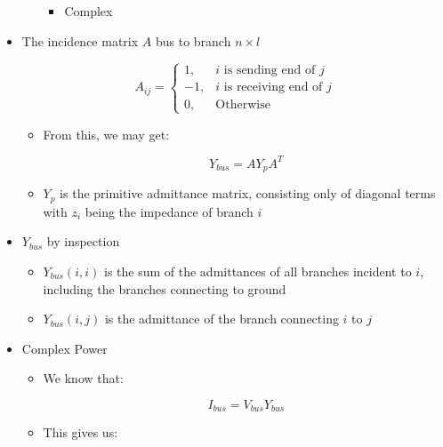 \begin{itemize}
\begin{itemize}
\begin{itemize}
          \item Complex

        \end{itemize}

    \end{itemize}

  \item The incidence matrix $A$ bus to branch $n\times l$

    $$A_{ij}=\left\{  \begin{array}{ll} 1,& i\text{ is sending end of }j\\ -1,&i\text{ is receiving end of }j\\ 0,&\text{Otherwise}\end{array}$$

      \begin{itemize}

        \item From this, we may get:

          $$Y_{bus}=A Y_p A^T$$

        \item $Y_p$ is the primitive admittance matrix, consisting only of diagonal terms with $z_i$ being the impedance of branch $i$

      \end{itemize}

    \item $Y_{bus}$ by inspection

      \begin{itemize}

        \item $Y_{bus}(i,i)$ is the sum of the admittances of all branches incident to $i$, including the branches connecting to ground

        \item $Y_{bus}(i,j)$ is the admittance of the branch connecting $i$ to $j$

      \end{itemize}

    \item Complex Power

      \begin{itemize}

        \item We know that:

          $$I_{bus}=V_{bus}Y_{bus}$$

        \item This gives us:


\end{itemize}
\end{itemize}
